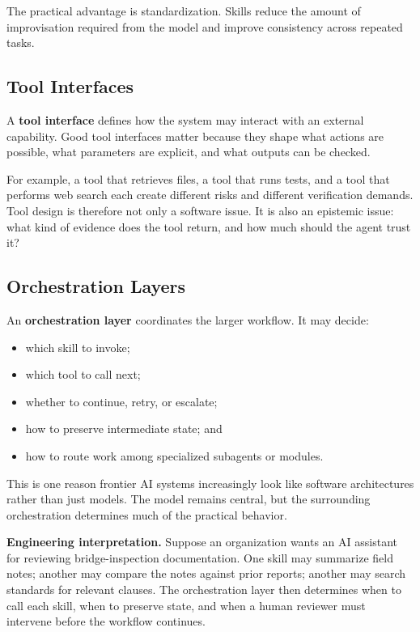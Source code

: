 \documentclass[12pt]{article}
\begin{document}
The practical advantage is standardization. Skills reduce the amount of improvisation required from the model and improve consistency across repeated tasks.

\subsection{Tool Interfaces}

A \textbf{tool interface} defines how the system may interact with an external capability. Good tool interfaces matter because they shape what actions are possible, what parameters are explicit, and what outputs can be checked.

For example, a tool that retrieves files, a tool that runs tests, and a tool that performs web search each create different risks and different verification demands. Tool design is therefore not only a software issue. It is also an epistemic issue: what kind of evidence does the tool return, and how much should the agent trust it?

\subsection{Orchestration Layers}

An \textbf{orchestration layer} coordinates the larger workflow. It may decide:
\begin{itemize}
    \item which skill to invoke;
    \item which tool to call next;
    \item whether to continue, retry, or escalate;
    \item how to preserve intermediate state; and
    \item how to route work among specialized subagents or modules.
\end{itemize}

This is one reason frontier AI systems increasingly look like software architectures rather than just models. The model remains central, but the surrounding orchestration determines much of the practical behavior.

\begin{ex-box}
\textbf{Engineering interpretation.} Suppose an organization wants an AI assistant for reviewing bridge-inspection documentation. One skill may summarize field notes; another may compare the notes against prior reports; another may search standards for relevant clauses. The orchestration layer then determines when to call each skill, when to preserve state, and when a human reviewer must intervene before the workflow continues.
\end{ex-box}
\end{document}
